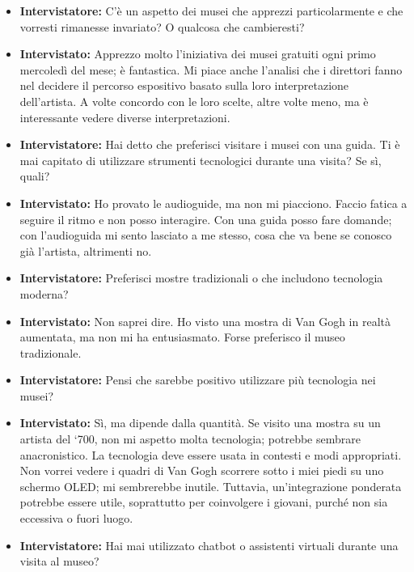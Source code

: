 \documentclass{article}
\begin{document}
\begin{itemize}
    \item \textbf{Intervistatore:} C’è un aspetto dei musei che apprezzi particolarmente e che vorresti rimanesse invariato? O qualcosa che cambieresti?

    \item \textbf{Intervistato:} Apprezzo molto l’iniziativa dei musei gratuiti ogni primo mercoledì del mese; è fantastica. Mi piace anche l’analisi che i direttori fanno nel decidere il percorso espositivo basato sulla loro interpretazione dell’artista. A volte concordo con le loro scelte, altre volte meno, ma è interessante vedere diverse interpretazioni.

    \item \textbf{Intervistatore:} Hai detto che preferisci visitare i musei con una guida. Ti è mai capitato di utilizzare strumenti tecnologici durante una visita? Se sì, quali?

    \item \textbf{Intervistato:} Ho provato le audioguide, ma non mi piacciono. Faccio fatica a seguire il ritmo e non posso interagire. Con una guida posso fare domande; con l’audioguida mi sento lasciato a me stesso, cosa che va bene se conosco già l’artista, altrimenti no.

    \item \textbf{Intervistatore:} Preferisci mostre tradizionali o che includono tecnologia moderna?

    \item \textbf{Intervistato:} Non saprei dire. Ho visto una mostra di Van Gogh in realtà aumentata, ma non mi ha entusiasmato. Forse preferisco il museo tradizionale.

    \item \textbf{Intervistatore:} Pensi che sarebbe positivo utilizzare più tecnologia nei musei?

    \item \textbf{Intervistato:} Sì, ma dipende dalla quantità. Se visito una mostra su un artista del ‘700, non mi aspetto molta tecnologia; potrebbe sembrare anacronistico. La tecnologia deve essere usata in contesti e modi appropriati. Non vorrei vedere i quadri di Van Gogh scorrere sotto i miei piedi su uno schermo OLED; mi sembrerebbe inutile. Tuttavia, un’integrazione ponderata potrebbe essere utile, soprattutto per coinvolgere i giovani, purché non sia eccessiva o fuori luogo.

    \item \textbf{Intervistatore:} Hai mai utilizzato chatbot o assistenti virtuali durante una visita al museo?


\end{itemize}
\end{document}
